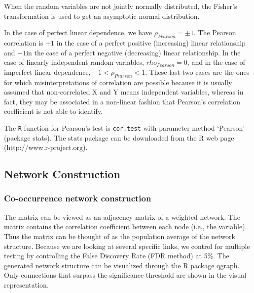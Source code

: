 \documentclass[a4paper]{article}
\begin{document}
When the random variables are not jointly normally distributed, the Fisher's transformation is used to get an asymptotic normal distribution.

In the case of perfect linear dependence, we have $\rho_{Pearson} = \pm1$. The Pearson correlation is $+1$ in the case of a perfect positive (increasing) linear relationship and $-1 $in the case of a perfect negative (decreasing) linear relationship. In the case of linearly independent random variables, $rho_{Pearson} = 0$, and in the case of imperfect linear dependence, $-1 < \rho_{Pearson} < 1$. These last two cases are the ones for which misinterpretations of correlation are possible because it is usually assumed that non-correlated X and Y means independent variables, whereas in fact, they may be associated in a non-linear fashion that Pearson's correlation coefficient is not able to identify.

The \texttt{R} function for Pearson's test is \texttt{cor.test} with parameter method `Pearson' (package stats). The stats package can be downloaded from the R web page (http://www.r-project.org).


\subsection*{Network Construction}
\subsubsection*{Co-occurrence network construction}
The matrix can be viewed as an adjacency matrix of a weighted network. The matrix contains the correlation coefficient between each node (i.e., the variable). Thus the matrix can be thought of as the population average of the network structure. Because we are looking at several specific links, we control for multiple testing by controlling the False Discovery Rate (FDR method) at 5\%. The generated network structure can be visualized through the R package qgraph. Only connections that surpass the significance threshold are shown in the visual representation. %
\end{document}
